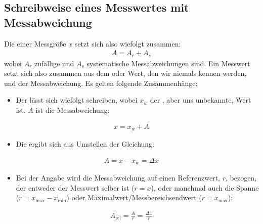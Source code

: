 \documentclass[letterpaper,10pt,english]{jupyterBook}
\begin{document}
\subsection{Schreibweise eines Messwertes mit Messabweichung}
\label{\detokenize{content/1_Messunsicherheiten:schreibweise-eines-messwertes-mit-messabweichung}}
\sphinxAtStartPar
Die  einer Messgröße \(x\) setzt sich also wiefolgt zusammen:
\begin{equation*}
\begin{split}A = A_r +  A_s\end{split}
\end{equation*}
\sphinxAtStartPar
wobei \(A_r\) zufällige und \(A_s\) systematische Messabweichungen sind. Ein Messwert setzt sich also zusammen aus dem  oder  Wert, den wir niemals kennen werden, und der Messabweichung. Es gelten folgende Zusammenhänge:
\begin{itemize}
\item {} 
\sphinxAtStartPar
Der  lässt sich wiefolgt schreiben, wobei \(x_w\) der , aber uns unbekannte, Wert ist. \(A\) ist die Messabweichung:

\end{itemize}
\begin{equation*}
\begin{split}x = x_w + A\end{split}
\end{equation*}\begin{itemize}
\item {} 
\sphinxAtStartPar
Die  ergibt sich aus Umstellen der Gleichung:

\end{itemize}
\begin{equation*}
\begin{split}A = x - x_w = \Delta x\end{split}
\end{equation*}\begin{itemize}
\item {} 
\sphinxAtStartPar
Bei der Angabe  wird die Messabweichung auf einen Referenzwert, \(r\), bezogen, der entweder der Messwert selber ist (\(r = x\)), oder manchmal auch die Spanne (\(r = x_\mathrm{max} - x_\mathrm{min}\)) oder Maximalwert/Messbereichsendwert (\(r = x_\mathrm{max}\)):

\end{itemize}
\begin{equation*}
\begin{split} A_\mathrm{rel} = \frac{A}{r} = \frac{\Delta x}{r}\end{split}
\end{equation*}
\end{document}
